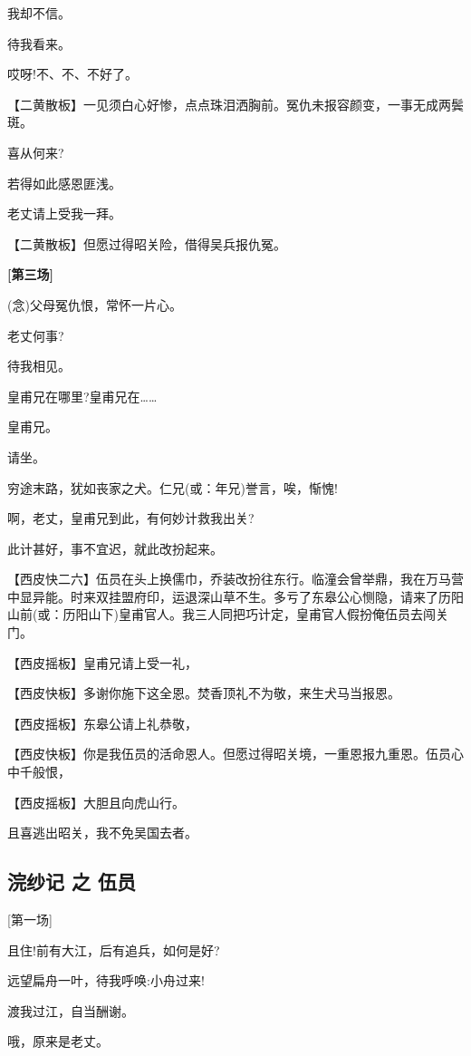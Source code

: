 我却不信。

待我看来。

哎呀!不、不、不好了。

【二黄散板】一见须白心好惨，点点珠泪洒胸前。冤仇未报容颜变，一事无成两鬓斑。

喜从何来?

若得如此感恩匪浅。

老丈请上受我一拜。

【二黄散板】但愿过得昭关险，借得吴兵报仇冤。

\textbf{{[}第三场{]}}

(念)父母冤仇恨，常怀一片心。

老丈何事?

待我相见。

皇甫兄在哪里?皇甫兄在\ldots{}\ldots{}

皇甫兄。

请坐。

穷途末路，犹如丧家之犬。仁兄(或：年兄)誉言，唉，惭愧!

啊，老丈，皇甫兄到此，有何妙计救我出关?

此计甚好，事不宜迟，就此改扮起来。

【西皮快二六】伍员在头上换儒巾，乔装改扮往东行。临潼会曾举鼎，我在万马营中显异能。时来双挂盟府印，运退深山草不生。多亏了东皋公心恻隐，请来了历阳山前(或：历阳山下)皇甫官人。我三人同把巧计定，皇甫官人假扮俺伍员去闯关门。

【西皮摇板】皇甫兄请上受一礼，

【西皮快板】多谢你施下这全恩。焚香顶礼不为敬，来生犬马当报恩。

【西皮摇板】东皋公请上礼恭敬，

【西皮快板】你是我伍员的活命恩人。但愿过得昭关境，一重恩报九重恩。伍员心中千般恨，

【西皮摇板】大胆且向虎山行。

且喜逃出昭关，我不免吴国去者。

\newpage
\hypertarget{ux6d63ux7eb1ux8bb0-ux4e4b-ux4f0dux5458}{%
\subsection{浣纱记 之
伍员}\label{ux6d63ux7eb1ux8bb0-ux4e4b-ux4f0dux5458}}

{[}第一场{]}

且住!前有大江，后有追兵，如何是好?

远望扁舟一叶，待我呼唤:小舟过来!

渡我过江，自当酬谢。

哦，原来是老丈。


